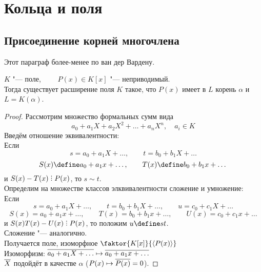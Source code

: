 \chapter{Кольца и поля}

\section{Присоединение корней многочлена}

Этот параграф более-менее по ван дер Вардену.

\begin{theorem}
	$ K $ "--- поле, $ \qquad P(x) \in K[x] $ "--- неприводимый. \\
	Тогда существует расширение поля $ K $ такое, что $ P(x) $ имеет в $ L $ корень $ \alpha $ и $ L = K(\alpha) $.
\end{theorem}

\begin{proof}
	Рассмотрим множество формальных сумм вида
	$$ a_0 + a_1X + a_2X^2 + \dots + a_nX^n, \quad a_i \in K $$
	Введём отношение эквивалентности: \\
	Если
	$$ s = a_0 + a_1X + \dots, \qquad t = b_0 + b_1X + \dots $$
	$$ S(x) \define a_0 + a_1x + \dots, \qquad T(x) \define b_0 + b_1x + \dots $$
	и $ S(x) - T(x) \divby P(x) $, то $ s \sim t $. \\
	Определим на множестве классов элквивалентности сложение и умножение: \\
	Если
	$$ s = a_0 + a_1X + \dots, \qquad t = b_0 + b_1X + \dots, \qquad u = c_0 + c_1X + \dots $$
	$$ S(x) = a_0 + a_1x + \dots, \qquad T(x) = b_0 + b_1x + \dots, \qquad U(x) = c_0 + c_1x + \dots $$
	и $ S(x)T(x) - U(x) \divby P(x) $, то положим $ u \define st $. \\
	Сложение "--- аналогично. \\
	Получается поле, изоморфное $ \faktor{K[x]}{\braket{P(x)}} $ \\
	Изоморфизм: $ \overline{a_0 + a_1X + \dots} \mapsto \overline{a_0 + a_1x + \dots} $ \\
	$ \overline X $ подойдёт в качестве $ \alpha $ (\as $ P(x) \mapsto \overline{P(x)} = 0 $).
\end{proof}

